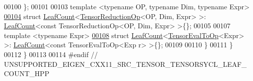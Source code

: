 \begin{DoxyCode}
00100 \};
00101 
00103 \textcolor{keyword}{template} <\textcolor{keyword}{typename} OP, \textcolor{keyword}{typename} Dim, \textcolor{keyword}{typename} Expr>
\hyperlink{struct_eigen_1_1_tensor_sycl_1_1internal_1_1_leaf_count_3_01_tensor_reduction_op_3_01_o_p_00_01_dim_00_01_expr_01_4_01_4}{00104} \textcolor{keyword}{struct }\hyperlink{struct_eigen_1_1_tensor_sycl_1_1internal_1_1_leaf_count}{LeafCount}<\hyperlink{class_eigen_1_1_tensor_reduction_op}{TensorReductionOp}<OP, Dim, Expr> >: 
      \hyperlink{struct_eigen_1_1_tensor_sycl_1_1internal_1_1_leaf_count}{LeafCount}<const TensorReductionOp<OP, Dim, Expr> >\{\};
00105 
00107 \textcolor{keyword}{template} <\textcolor{keyword}{typename} Expr>
\hyperlink{struct_eigen_1_1_tensor_sycl_1_1internal_1_1_leaf_count_3_01_tensor_eval_to_op_3_01_expr_01_4_01_4}{00108} \textcolor{keyword}{struct }\hyperlink{struct_eigen_1_1_tensor_sycl_1_1internal_1_1_leaf_count}{LeafCount}<\hyperlink{class_eigen_1_1_tensor_eval_to_op}{TensorEvalToOp}<Expr> >: \hyperlink{struct_eigen_1_1_tensor_sycl_1_1internal_1_1_leaf_count}{LeafCount}<const TensorEvalToOp<Exp
      r> >\{\};
00109 
00110 \} 
00111 \} 
00112 \} 
00113 
00114 \textcolor{preprocessor}{#endif  // UNSUPPORTED\_EIGEN\_CXX11\_SRC\_TENSOR\_TENSORSYCL\_LEAF\_COUNT\_HPP}
\end{DoxyCode}
